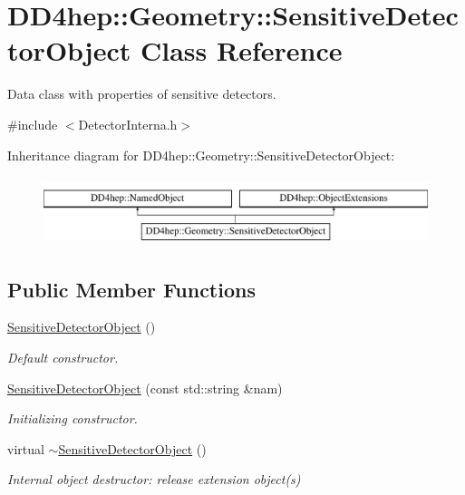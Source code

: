 \hypertarget{class_d_d4hep_1_1_geometry_1_1_sensitive_detector_object}{}\section{D\+D4hep\+:\+:Geometry\+:\+:Sensitive\+Detector\+Object Class Reference}
\label{class_d_d4hep_1_1_geometry_1_1_sensitive_detector_object}


Data class with properties of sensitive detectors.  




{\ttfamily \#include $<$Detector\+Interna.\+h$>$}

Inheritance diagram for D\+D4hep\+:\+:Geometry\+:\+:Sensitive\+Detector\+Object\+:\begin{figure}[H]
\begin{center}
\leavevmode
\includegraphics[height=2.000000cm]{class_d_d4hep_1_1_geometry_1_1_sensitive_detector_object}
\end{center}
\end{figure}
\subsection*{Public Member Functions}
\begin{DoxyCompactItemize}
\item 
\hyperlink{class_d_d4hep_1_1_geometry_1_1_sensitive_detector_object_ada6df51a316e3a54c71889a0a7fbd8fd}{Sensitive\+Detector\+Object} ()
\begin{DoxyCompactList}\small\item\em Default constructor. \end{DoxyCompactList}\item 
\hyperlink{class_d_d4hep_1_1_geometry_1_1_sensitive_detector_object_a663926f8216403d414c27ed7c57cc2c3}{Sensitive\+Detector\+Object} (const std\+::string \&nam)
\begin{DoxyCompactList}\small\item\em Initializing constructor. \end{DoxyCompactList}\item 
virtual \hyperlink{class_d_d4hep_1_1_geometry_1_1_sensitive_detector_object_a56ae1536039de98974a535cf6f2e66a1}{$\sim$\+Sensitive\+Detector\+Object} ()
\begin{DoxyCompactList}\small\item\em Internal object destructor\+: release extension object(s) \end{DoxyCompactList}\end{DoxyCompactItemize}
